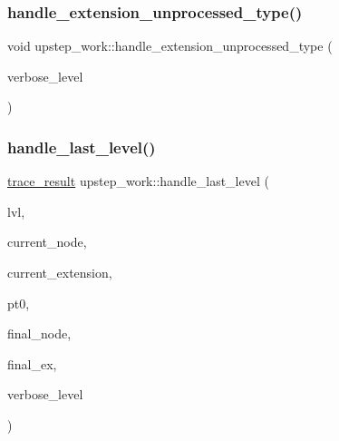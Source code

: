 \subsubsection{\texorpdfstring{handle\+\_\+extension\+\_\+unprocessed\+\_\+type()}{handle\_extension\_unprocessed\_type()}}
{\footnotesize\ttfamily void upstep\+\_\+work\+::handle\+\_\+extension\+\_\+unprocessed\+\_\+type (\begin{DoxyParamCaption}\item[{\mbox{\hyperlink{galois_8h_a09fddde158a3a20bd2dcadb609de11dc}{I\+NT}}}]{verbose\+\_\+level }\end{DoxyParamCaption})}

\mbox{\label{classupstep__work_a5e4dd0050b47d8143df44a4364003daa}} 
\subsubsection{\texorpdfstring{handle\+\_\+last\+\_\+level()}{handle\_last\_level()}}
{\footnotesize\ttfamily \mbox{\hyperlink{snakesandladders_8h_ac88defea077c05403847ed918e76bdde}{trace\+\_\+result}} upstep\+\_\+work\+::handle\+\_\+last\+\_\+level (\begin{DoxyParamCaption}\item[{\mbox{\hyperlink{galois_8h_a09fddde158a3a20bd2dcadb609de11dc}{I\+NT}}}]{lvl,  }\item[{\mbox{\hyperlink{galois_8h_a09fddde158a3a20bd2dcadb609de11dc}{I\+NT}}}]{current\+\_\+node,  }\item[{\mbox{\hyperlink{galois_8h_a09fddde158a3a20bd2dcadb609de11dc}{I\+NT}}}]{current\+\_\+extension,  }\item[{\mbox{\hyperlink{galois_8h_a09fddde158a3a20bd2dcadb609de11dc}{I\+NT}}}]{pt0,  }\item[{\mbox{\hyperlink{galois_8h_a09fddde158a3a20bd2dcadb609de11dc}{I\+NT}} \&}]{final\+\_\+node,  }\item[{\mbox{\hyperlink{galois_8h_a09fddde158a3a20bd2dcadb609de11dc}{I\+NT}} \&}]{final\+\_\+ex,  }\item[{\mbox{\hyperlink{galois_8h_a09fddde158a3a20bd2dcadb609de11dc}{I\+NT}}}]{verbose\+\_\+level }\end{DoxyParamCaption})}

\mbox{\label{classupstep__work_a3b8bd802151efce3a5651712a1ef48ee}} 
